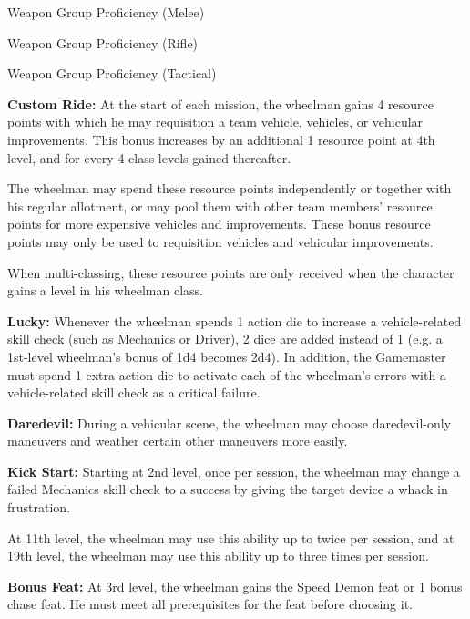 Weapon Group Proficiency (Melee)

Weapon Group Proficiency (Rifle)

Weapon Group Proficiency (Tactical)

\textbf{Custom Ride:} At the start of each mission, the wheelman gains 4 resource points with which he may requisition a team vehicle, vehicles, or vehicular improvements. This bonus increases by an additional 1 resource point at 4th level, and for every 4 class levels gained thereafter.

The wheelman may spend these resource points independently or together with his regular allotment, or may pool them with other team members’ resource points for more expensive vehicles and improvements. These bonus resource points may only be used to requisition vehicles and vehicular improvements.

When multi-classing, these resource points are only received when the character gains a level in his wheelman class.

\vspace*{5pt}

\textbf{Lucky:} Whenever the wheelman spends 1 action die to increase a vehicle-related skill check (such as Mechanics or Driver), 2 dice are added instead of 1 (e.g. a 1st-level wheelman’s bonus of 1d4 becomes 2d4). In addition, the Gamemaster must spend 1 extra action die to activate each of the wheelman’s errors with a vehicle-related skill check as a critical failure.

\vspace*{5pt}

\textbf{Daredevil:} During a vehicular scene, the wheelman may choose daredevil-only maneuvers and weather certain other maneuvers more easily.

\textbf{Kick Start:} Starting at 2nd level, once per session, the wheelman may change a failed Mechanics skill check to a success by giving the target device a whack in frustration.

At 11th level, the wheelman may use this ability up to twice per session, and at 19th level, the wheelman may use this ability up to three times per session.

\textbf{Bonus Feat:} At 3rd level, the wheelman gains the Speed Demon feat or 1 bonus chase feat. He must meet all prerequisites for the feat before choosing it.

